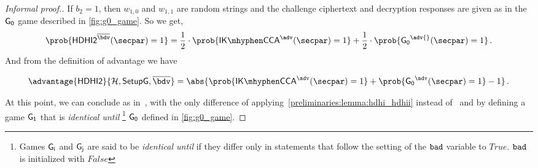 \begin{proof}[Informal proof.]
    If $b_2=1$, then $w_{1, 0}$ and $w_{1, 1}$ are random strings and the challenge ciphertext and decryption responses are given as in the $\mathsf{G_0}$ game described in \cref{fig:g0_game}.
%
    So we get,
        \[
            \prob{\hdhii^{\bdvii{}}(\secpar) = 1} = \frac{1}{2}\cdot\prob{\ikcca^{\adv}(\secpar) = 1} + \frac{1}{2}\cdot\prob{\gamestyle{G_0}^\adv{}(\secpar) = 1}\,.
        \]
    And from the definition of \hdhii{} advantage we have

        \[
            \advantage{\hdhii}{\hashSet,\groupSetup,\bdvii{}} = \abs{\prob{\ikcca^{\adv}(\secpar)=1} + \prob{\gamestyle{G_0}^{\adv}(\secpar)=1} - 1}\,.
        \]

    At this point, we can conclude as in~\cite[Theorem 6.2]{abdalla2010robust}, with the only difference of applying~\cref{preliminaries:lemma:hdhi_hdhii} instead of~\cite[Lemma 6.1]{abdalla2010robust} and by defining a game $\mathsf{G_1}$ that is \emph{identical until} \badvar\footnote{Games $\mathsf{G_i}$ and $\mathsf{G_j}$ are said to be \emph{identical until} \badvar if they differ only in statements that follow the setting of the $\texttt{bad}{}$ variable to $True$. $\texttt{bad}$ is initialized with $False$} $\mathsf{G_0}$ defined in \cref{fig:g0_game}.
\end{proof}


